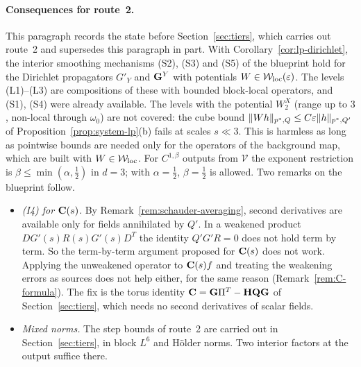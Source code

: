 \paragraph{Consequences for route~2.} This paragraph records the state before Section~\ref{sec:tiers}, which carries out route~2 and supersedes this paragraph in part. With Corollary~\ref{cor:lp-dirichlet}, the interior smoothing mechanisms (S2), (S3) and (S5) of the blueprint hold for the Dirichlet propagators $G'_Y$ and $\mathbf G^Y$ with potentials $W\in\mathcal W_{\rm loc}(\varepsilon)$. The levels (L1)--(L3) are compositions of these with bounded block-local operators, and (S1), (S4) were already available. The levels with the potential $W_2^X$ (range up to $3$, non-local through $\omega_0$) are not covered: the cube bound $\|Wh\|_{p^*,Q}\le C\varepsilon\|h\|_{p^*,Q'}$ of Proposition~\ref{prop:system-lp}(b) fails at scales $s\ll3$. This is harmless as long as pointwise bounds are needed only for the operators of the background map, which are built with $W\in\mathcal W_{\rm loc}$. For $C^{1,\beta}$ outputs from $\mathscr V$ the exponent restriction is $\beta\le\min(\alpha,\frac12)$ in $d=3$; with $\alpha=\frac12$, $\beta=\frac12$ is allowed. Two remarks on the blueprint follow.
\begin{itemize}
\item \emph{(I4) for $\mathbf C(s)$.} By Remark~\ref{rem:schauder-averaging}, second derivatives are available only for fields annihilated by $Q'$. In a weakened product $DG'(s)R(s)G'(s)D^T$ the identity $Q'G'R=0$ does not hold term by term. So the term-by-term argument proposed for $\mathbf C(s)$ does not work. Applying the unweakened operator to $\mathbf C(s)f$ and treating the weakening errors as sources does not help either, for the same reason (Remark~\ref{rem:C-formula}). The fix is the torus identity $\mathbf C=\mathbf G\Pi^T-\mathbf H\mathbf Q\mathbf G$ of Section~\ref{sec:tiers}, which needs no second derivatives of scalar fields.
\item \emph{Mixed norms.} The step bounds of route~2 are carried out in Section~\ref{sec:tiers}, in block $L^6$ and H\"older norms. Two interior factors at the output suffice there.
\end{itemize}

